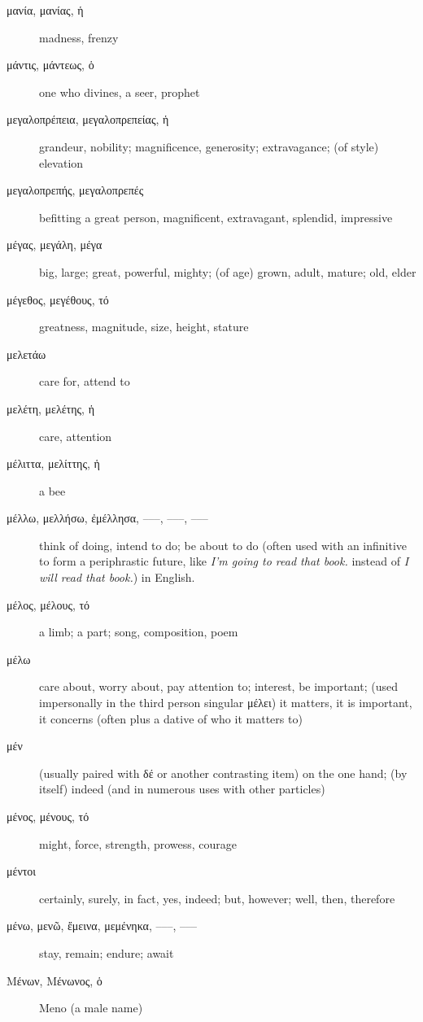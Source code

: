 \documentclass[12pt,letterpaper]{article}
\begin{document}
\begin{description}
    \item[\textgreek{μανία, μανίας, ἡ}] madness, frenzy
    \item[\textgreek{μάντις, μάντεως, ὁ}] one who divines, a seer, prophet
    \item[\textgreek{μεγαλοπρέπεια, μεγαλοπρεπείας, ἡ}] grandeur, nobility; magnificence, generosity; extravagance; (of style) elevation
    \item[\textgreek{μεγαλοπρεπής, μεγαλοπρεπές}] befitting a great person, magnificent, extravagant, splendid, impressive
    \item[\textgreek{μέγας, μεγάλη, μέγα}] \marginnote{*}big, large; great, powerful, mighty; (of age) grown, adult, mature; old, elder
    \item[\textgreek{μέγεθος, μεγέθους, τό}] \marginnote{*}greatness, magnitude, size, height, stature
    \item[\textgreek{μελετάω}] care for, attend to
    \item[\textgreek{μελέτη, μελέτης, ἡ}] care, attention
    \item[\textgreek{μέλιττα, μελίττης, ἡ}] a bee
    \item[\textgreek{μέλλω, μελλήσω, ἐμέλλησα, –––, –––, –––}] \marginnote{*}think of doing, intend to do; be about to do (often used with an infinitive to form a periphrastic future, like \textit{I'm going to read that book.} instead of \textit{I will read that book.}) in English.
    \item[\textgreek{μέλος, μέλους, τό}] a limb; a part; song, composition, poem
    \item[\textgreek{μέλω}] care about, worry about, pay attention to; interest, be important; (used impersonally in the third person singular \textgreek{μέλει}) it matters, it is important, it concerns (often plus a dative of who it matters to)
    \item[\textgreek{μέν}] \marginnote{*}(usually paired with δέ or another contrasting item) on the one hand; (by itself) indeed (and in numerous uses with other particles)
    \item[\textgreek{μένος, μένους, τό}] might, force, strength, prowess, courage
    \item[\textgreek{μέντοι}] \marginnote{*}certainly, surely, in fact, yes, indeed; but, however; well, then, therefore
    \item[\textgreek{μένω, μενῶ, ἔμεινα, μεμένηκα, –––, –––}] \marginnote{*}stay, remain; endure; await
    \item[\textgreek{Μένων, Μένωνος, ὁ}] Meno (a male name)

\end{description}
\end{document}
